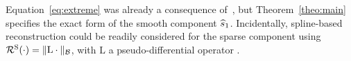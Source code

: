 \documentclass[12pt]{article}
\begin{document}
    Equation~\eqref{eq:extreme} was already a consequence of~\cite[Theorem 2]{unser2022convex}, but Theorem~\ref{theo:main} specifies the exact form of the smooth component $\widehat{s}_1$. Incidentally, spline-based reconstruction could be readily considered for the sparse component using $\mathcal{R}^\mathrm{S}(\cdot) = \|\mathrm{L}\cdot\|_\mathcal{B}$, with $\mathrm{L}$ a pseudo-differential operator \cite{unser2017splines}.



\end{document}
